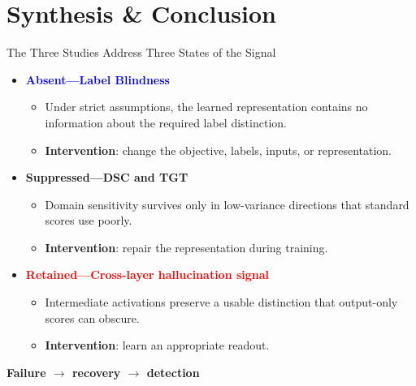 \documentclass[aspectratio=1610]{beamer}
\newcommand{\sectionpubinfo}{}
\begin{document}
\renewcommand{\sectionpubinfo}{}
\section{Synthesis \& Conclusion}

\begin{frame}{The Three Studies Address Three States of the Signal}
\begin{itemize}
  \item \textcolor{blue}{\textbf{Absent---Label Blindness}}
  \begin{itemize}
    \item Under strict assumptions, the learned representation contains no information about the required label distinction.
    \item \textbf{Intervention}: change the objective, labels, inputs, or representation.
  \end{itemize}
  \item \textcolor{green!60!black}{\textbf{Suppressed---DSC and TGT}}
  \begin{itemize}
    \item Domain sensitivity survives only in low-variance directions that standard scores use poorly.
    \item \textbf{Intervention}: repair the representation during training.
  \end{itemize}
  \item \textcolor{red}{\textbf{Retained---Cross-layer hallucination signal}}
  \begin{itemize}
    \item Intermediate activations preserve a usable distinction that output-only scores can obscure.
    \item \textbf{Intervention}: learn an appropriate readout.
  \end{itemize}
\end{itemize}

\vfill
\begin{center}
  \Large \textbf{Failure $\longrightarrow$ recovery $\longrightarrow$ detection}
\end{center}
\end{frame}
\end{document}
